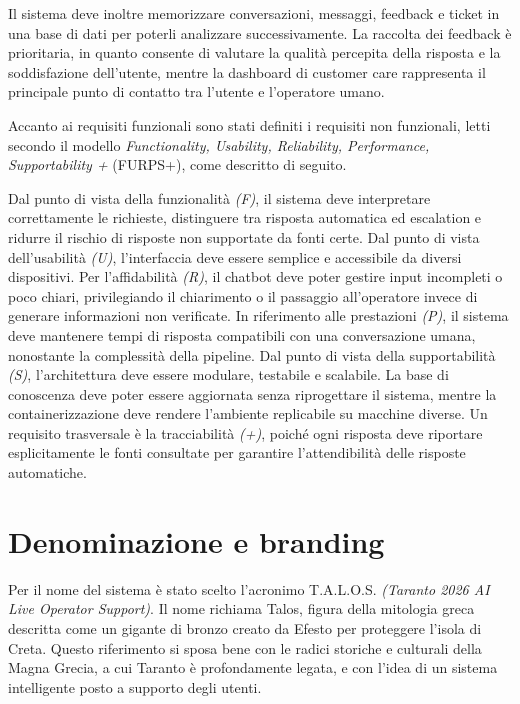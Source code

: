 Il sistema deve inoltre memorizzare conversazioni, messaggi, feedback e ticket in una base di dati per poterli analizzare successivamente. La raccolta dei feedback è prioritaria, in quanto consente di valutare la qualità percepita della risposta e la soddisfazione dell'utente, mentre la dashboard di customer care rappresenta il principale punto di contatto tra l'utente e l'operatore umano.

Accanto ai requisiti funzionali sono stati definiti i requisiti non funzionali, letti secondo il modello \textit{Functionality, Usability, Reliability, Performance, Supportability +} (FURPS+), come descritto di seguito.

Dal punto di vista della funzionalità \textit{(F)}, il sistema deve interpretare correttamente le richieste, distinguere tra risposta automatica ed escalation e ridurre il rischio di risposte non supportate da fonti certe.
Dal punto di vista dell’usabilità \textit{(U)}, l’interfaccia deve essere semplice e accessibile da diversi dispositivi. Per l’affidabilità \textit{(R)}, il chatbot deve poter gestire input incompleti o poco chiari, privilegiando il chiarimento o il passaggio all’operatore invece di generare informazioni non verificate.
In riferimento alle prestazioni \textit{(P)}, il sistema deve mantenere tempi di risposta compatibili con una conversazione umana, nonostante la complessità della pipeline.
Dal punto di vista della supportabilità \textit{(S)}, l’architettura deve essere modulare, testabile e scalabile. La base di conoscenza deve poter essere aggiornata senza riprogettare il sistema, mentre la containerizzazione deve rendere l’ambiente replicabile su macchine diverse.
Un requisito trasversale è la tracciabilità \textit{(+)}, poiché ogni risposta deve riportare esplicitamente le fonti consultate per garantire l'attendibilità delle risposte automatiche.

\section{Denominazione e branding}

Per il nome del sistema è stato scelto l’acronimo T.A.L.O.S. \textit{(Taranto 2026 AI Live Operator Support)}. Il nome richiama Talos, figura della mitologia greca descritta come un gigante di bronzo creato da Efesto per proteggere l’isola di Creta. Questo riferimento si sposa bene con le radici storiche e culturali della Magna Grecia, a cui Taranto è profondamente legata, e con l’idea di un sistema intelligente posto a supporto degli utenti.


